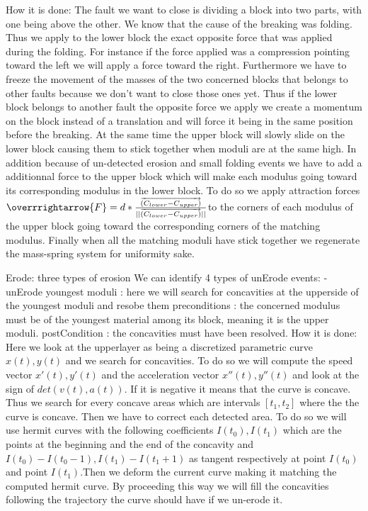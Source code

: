 \documentclass[12pt, a4paper]{memoir} %
\begin{document}
	How it is done: The fault we want to close is dividing a block into two parts, with one being above the other. We know that the cause of the breaking was folding. Thus we apply to the lower block the exact opposite force that was applied during the folding. For instance if the force applied was a compression pointing toward the left we will apply a force toward the right. Furthermore we have to freeze the movement of the masses of the two concerned blocks that belongs to other faults because we don't want to close those ones yet. Thus if the lower block belongs to another fault the opposite force we apply we create a momentum on the block instead of a translation and will force it being in the same position before the breaking. At the same time the upper block will slowly slide on the lower block causing them to stick together when moduli are at the same high. In addition because of un-detected erosion and small folding events we have to add a additionnal force to the upper block which will make each modulus going toward its corresponding modulus in the lower block. To do so we apply attraction forces $\overrrightarrow{F} = d*\frac{\overrightarrow{(C_{lower} - C_{upper})} }{||\overrightarrow{(C_{lower} - C_{upper})}||}$to the corners of each modulus of the upper block going toward the corresponding corners of the matching modulus. Finally when all the matching moduli have stick together we regenerate the mass-spring system for uniformity sake.

Erode: three types of erosion
	We can identify 4 types of unErode events:
		-unErode youngest moduli :
			here we will search for concavities at the upperside of the youngest moduli and resobe them 
			preconditions : the concerned modulus must be of the youngest material among its block, meaning it is the upper moduli.
			postCondition : the concavities must have been resolved.
			How it is done: Here we look at the upperlayer as being a discretized parametric curve $x(t),y(t)$ and we search for concavities. To do so we will compute the speed vector $x'(t),y'(t)$ and the acceleration vector $x''(t),y''(t)$ and look at the sign of $det(v(t),a(t))$. If it is negative it means that the curve is concave. Thus we search for every concave areas which are intervals $[t_1,t_2]$ where the the curve is concave. Then we have to correct each detected area. To do so we will use hermit curves with the following coefficients $I(t_0), I(t_1)$ which are the points at the beginning and the end of the concavity and $I(t_0) - I(t_0 - 1), I(t_1) - I(t_1 + 1)$  as tangent respectively at point $I(t_0)$ and point $I(t_1)$.Then we deform the current curve making it matching the computed hermit curve. By proceeding this way we will fill the concavities following the trajectory the curve should have if we un-erode it.
			
\end{document}
